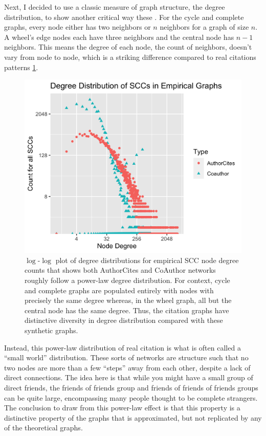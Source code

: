 Next, I decided to use a classic measure of graph structure, the degree
distribution, to show another critical way these . For the cycle and
complete graphs, every node either has two neighbors or \(n\) neighbors
for a graph of size \(n\). A wheel's edge nodes each have three
neighbors and the central node has \(n-1\) neighbors. This means the
degree of each node, the count of neighbors, doesn't vary from node to
node, which is a striking difference compared to real citations patterns
\ref{fig:degdist}.

\begin{figure}
\hypertarget{fig:degdist}{%
\centering
\includegraphics{figures/scc_degree_distribution.png}
\caption{\(\log\)-\(\log\) plot of degree distributions for empirical
SCC node degree counts that shows both AuthorCites and CoAuthor networks
roughly follow a power-law degree distribution. For context, cycle and
complete graphs are populated entirely with nodes with precisely the
same degree whereas, in the wheel graph, all but the central node has
the same degree. Thus, the citation graphs have distinctive diversity in
degree distribution compared with these synthetic
graphs.}\label{fig:degdist}
}
\end{figure}

Instead, this power-law distribution of real citation is what is often
called a ``small world'' distribution. These sorts of networks are
structure such that no two nodes are more than a few ``steps'' away from
each other, despite a lack of direct connections. The idea here is that
while you might have a small group of direct friends, the friends of
friends group and friends of friends of friends groups can be quite
large, encompassing many people thought to be complete strangers. The
conclusion to draw from this power-law effect is that this property is a
distinctive property of the graphs that is approximated, but not
replicated by any of the theoretical graphs.

